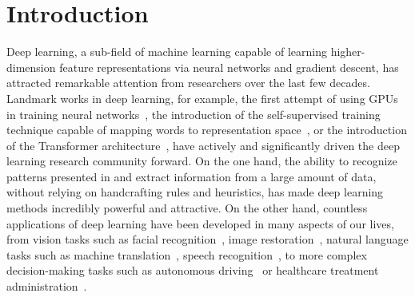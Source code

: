 
\chapter{Introduction} %
\label{ch:introduction} %


%
%
%
%
%
%
%
%

%
Deep learning, a sub-field of machine learning capable of learning higher-dimension feature representations via neural networks and gradient descent, has attracted remarkable attention from researchers over the last few decades.
%
Landmark works in deep learning, for example, the first attempt of using GPUs in training neural networks~\cite{krizhevsky2012imagenet}, the introduction of the self-supervised training technique capable of mapping words to representation space~\cite{mikolov2013efficient}, or the introduction of the Transformer architecture~\cite{vaswani2017attention}, have actively and significantly driven the deep learning research community forward. 
%
On the one hand, the ability to recognize patterns presented in and extract information from a large amount of data, without relying on handcrafting rules and heuristics, has made deep learning methods incredibly powerful and attractive.
%
On the other hand, countless applications of deep learning have been developed in many aspects of our lives, from vision tasks such as facial recognition~\cite{masi2018deep}, image restoration~\cite{gao2017demand}, natural language tasks such as machine translation~\cite{stahlberg2020neural}, speech recognition~\cite{kumar2019comprehensive}, to more complex decision-making tasks such as autonomous driving~\cite{kiran2021deep} or healthcare treatment administration~\cite{yu2021reinforcement}.


